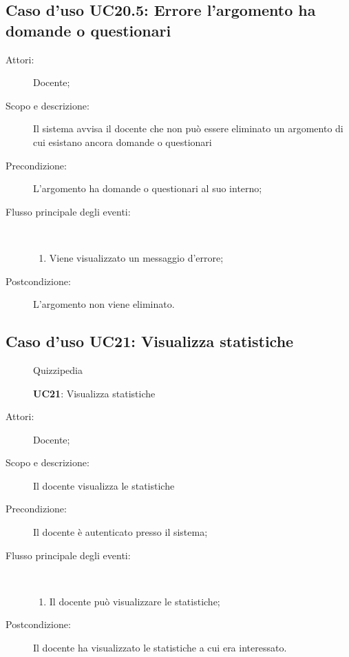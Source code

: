 \subsection{Caso d'uso UC20.5: Errore l'argomento ha domande o questionari}\begin{description}
	\item[Attori:] Docente;
	\item[Scopo e descrizione:] Il sistema avvisa il docente che non può essere eliminato un argomento di cui esistano ancora domande o questionari
	\item[Precondizione:] L'argomento ha domande o questionari al suo interno;
	
	\item[Flusso principale degli eventi:] \ 
	\begin{enumerate}
		\item Viene visualizzato un messaggio d'errore;
		
	\end{enumerate}
	\item[Postcondizione:] L'argomento non viene eliminato.
\end{description}
\hypertarget{UC21}{}
\subsection{Caso d'uso UC21: Visualizza statistiche}
\begin{figure}[H]
	\centering
	\begin{resizedtikzpicture}{\textwidth}
		\begin{umlsystem}[x=0, fill=lightgray!20]{Quizzipedia}
			\umlassoc{Docente}{10}
			\umlinherit{13}{10}
			\umlinherit{12}{10}
			\umlinherit{11}{10}
		\end{umlsystem}
	\end{resizedtikzpicture}
	\caption{\textbf{UC21}: Visualizza statistiche}
	\label{UC21}
\end{figure}
\begin{description}
	\item[Attori:] Docente;
	\item[Scopo e descrizione:] Il docente visualizza le statistiche
	\item[Precondizione:] Il docente è autenticato presso il sistema;
	
	\item[Flusso principale degli eventi:] \ 
	\begin{enumerate}
		\item Il docente può visualizzare le statistiche;
		
	\end{enumerate}
	\item[Postcondizione:] Il docente ha visualizzato le statistiche a cui era interessato.
\end{description}
\hypertarget{UC22}{}
